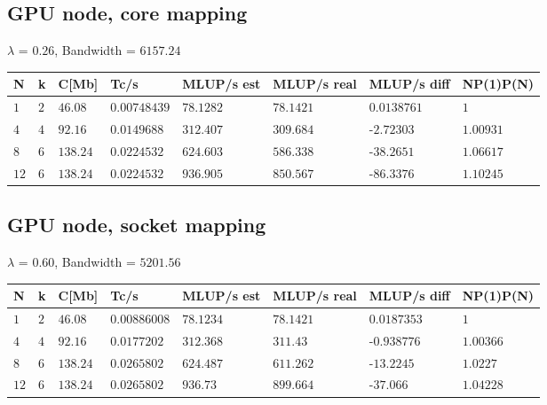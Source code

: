 \documentclass[11pt,a4paper]{article}
\begin{document}
\subsection*{GPU node, core mapping}
$\lambda$ = $0.26$, Bandwidth = $6157.24$
\begin{table}[H]
    \centering
    \begin{tabular}{|l|l|l|l|l|l|l|l|}
    \toprule
    N 		& k 	& C[Mb] 	& Tc/s 			& MLUP/s est 	& MLUP/s real 	& MLUP/s diff  & NP(1)P(N) \\
    \midrule
    $1$ 	& $2$ 	& $46.08$ 	& $0.00748439$ 	& $78.1282$ 	& $78.1421$ 	&$0.0138761$ & $1$ \\
    $4$ 	& $4$ 	& $92.16$ 	& $0.0149688$ 	& $312.407$ 	& $309.684$ 	&-$2.72303$ & $1.00931$ \\
    $8$ 	& $6$ 	& $138.24$ 	& $0.0224532$ 	& $624.603$ 	& $586.338$ 	&-$38.2651$ & $1.06617$ \\
    $12$ 	& $6$ 	& $138.24$ 	& $0.0224532$ 	& $936.905$ 	& $850.567$ 	&-$86.3376$ & $1.10245$ \\
    \bottomrule
    \end{tabular}
\end{table}
\subsection*{GPU node, socket mapping}
$\lambda$ = $0.60$, Bandwidth = $5201.56$
\begin{table}[H]
    \centering
    \begin{tabular}{|l|l|l|l|l|l|l|l|}
    \toprule
    N 		& k 	& C[Mb] 	& Tc/s 			& MLUP/s est 	& MLUP/s real 	& MLUP/s diff  & NP(1)P(N) \\
    \midrule
    $1$ 	& $2$ 	& $46.08$ 	& $0.00886008$ 	& $78.1234$ 	& $78.1421$ 	&$0.0187353$ & $1$ \\
    $4$ 	& $4$ 	& $92.16$ 	& $0.0177202$ 	& $312.368$ 	& $311.43$ 		&-$0.938776$ & $1.00366$ \\
    $8$ 	& $6$ 	& $138.24$ 	& $0.0265802$ 	& $624.487$ 	& $611.262$ 	&-$13.2245$ & $1.0227$ \\
    $12$ 	& $6$ 	& $138.24$ 	& $0.0265802$ 	& $936.73$ 		& $899.664$ 	&-$37.066$ & $1.04228$ \\
    \bottomrule
    \end{tabular}
\end{table}
\end{document}
